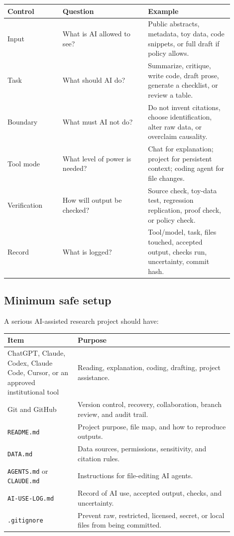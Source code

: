 \documentclass[11pt]{article}
\begin{document}
\begin{longtable}{p{0.22\linewidth}p{0.34\linewidth}p{0.34\linewidth}}
\toprule
\textbf{Control} & \textbf{Question} & \textbf{Example}\\
\midrule
Input & What is AI allowed to see? & Public abstracts, metadata, toy data, code snippets, or full draft if policy allows.\\
Task & What should AI do? & Summarize, critique, write code, draft prose, generate a checklist, or review a table.\\
Boundary & What must AI not do? & Do not invent citations, choose identification, alter raw data, or overclaim causality.\\
Tool mode & What level of power is needed? & Chat for explanation; project for persistent context; coding agent for file changes.\\
Verification & How will output be checked? & Source check, toy-data test, regression replication, proof check, or policy check.\\
Record & What is logged? & Tool/model, task, files touched, accepted output, checks run, uncertainty, commit hash.\\
\bottomrule
\end{longtable}

\subsection{Minimum safe setup}

A serious AI-assisted research project should have:

\begin{longtable}{p{0.28\linewidth}p{0.62\linewidth}}
\toprule
\textbf{Item} & \textbf{Purpose}\\
\midrule
ChatGPT, Claude, Codex, Claude Code, Cursor, or an approved institutional tool & Reading, explanation, coding, drafting, project assistance.\\
Git and GitHub & Version control, recovery, collaboration, branch review, and audit trail.\\
\texttt{README.md} & Project purpose, file map, and how to reproduce outputs.\\
\texttt{DATA.md} & Data sources, permissions, sensitivity, and citation rules.\\
\texttt{AGENTS.md} or \texttt{CLAUDE.md} & Instructions for file-editing AI agents.\\
\texttt{AI-USE-LOG.md} & Record of AI use, accepted output, checks, and uncertainty.\\
\texttt{.gitignore} & Prevent raw, restricted, licensed, secret, or local files from being committed.\\
\bottomrule
\end{longtable}
\end{document}
